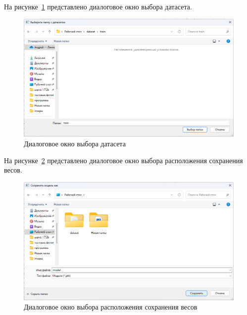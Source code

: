 На рисунке~\ref{fig:dataset_select} представлено диалоговое окно выбора датасета.
\begin{figure}[H]
	\centering
	\includegraphics[width=0.7\linewidth]{"images/выбор датасета"}
	\caption{Диалоговое окно выбора датасета}
	\label{fig:dataset_select}
\end{figure}

На рисунке~\ref{fig:weights_save} представлено диалоговое окно выбора расположения сохранения весов.
\begin{figure}[H]
	\centering
	\includegraphics[width=0.7\linewidth]{"images/сохранение весов"}
	\caption{Диалоговое окно выбора расположения сохранения весов}
	\label{fig:weights_save}
\end{figure}

